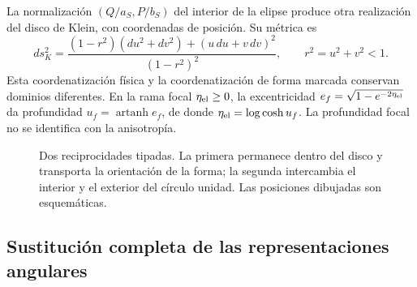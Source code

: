 La normalización \((Q/a_S,P/b_S)\) del interior de la elipse produce otra realización del disco de Klein, con coordenadas de posición. Su métrica es
\[
 ds_K^2=\frac{(1-r^2)(du^2+dv^2)+(u\,du+v\,dv)^2}{(1-r^2)^2},
 \qquad r^2=u^2+v^2<1.
\]
Esta coordenatización física y la coordenatización de forma marcada conservan dominios diferentes. En la rama focal \(\eta_{\rm el}\ge0\), la excentricidad \(e_f=\sqrt{1-e^{-2\eta_{\rm el}}}\) da profundidad \(u_f=\operatorname{artanh}e_f\), de donde \(\eta_{\rm el}=\log\cosh u_f\). La profundidad focal no se identifica con la anisotropía.

\begin{figure}[htbp]
\centering
{}
\caption{Dos reciprocidades tipadas. La primera permanece dentro del disco y transporta la orientación de la forma; la segunda intercambia el interior y el exterior del círculo unidad. Las posiciones dibujadas son esquemáticas.}
\label{fig:rec-dos-cartas}
\end{figure}

\subsection{Sustitución completa de las representaciones angulares}
\label{rec:sustitucion}

